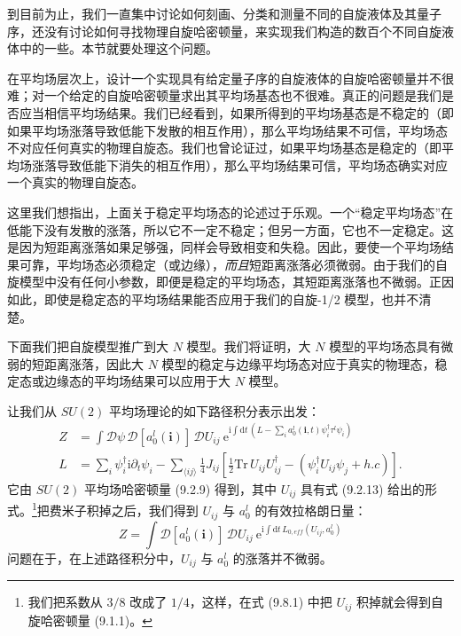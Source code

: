 到目前为止，我们一直集中讨论如何刻画、分类和测量不同的自旋液体及其量子序，还没有讨论如何寻找物理自旋哈密顿量，来实现我们构造的数百个不同自旋液体中的一些。本节就要处理这个问题。

在平均场层次上，设计一个实现具有给定量子序的自旋液体的自旋哈密顿量并不很难；对一个给定的自旋哈密顿量求出其平均场基态也不很难。真正的问题是我们是否应当相信平均场结果。我们已经看到，如果所得到的平均场基态是不稳定的（即如果平均场涨落导致低能下发散的相互作用），那么平均场结果不可信，平均场态不对应任何真实的物理自旋态。我们也曾论证过，如果平均场基态是稳定的（即平均场涨落导致低能下消失的相互作用），那么平均场结果可信，平均场态确实对应一个真实的物理自旋态。

这里我们想指出，上面关于稳定平均场态的论述过于乐观。一个“稳定平均场态”在低能下没有发散的涨落，所以它不一定不稳定；但另一方面，它也不一定稳定。这是因为短距离涨落如果足够强，同样会导致相变和失稳。因此，要使一个平均场结果可靠，平均场态必须稳定（或边缘），\emph{而且}短距离涨落必须微弱。由于我们的自旋模型中没有任何小参数，即便是稳定的平均场态，其短距离涨落也不微弱。正因如此，即使是稳定态的平均场结果能否应用于我们的自旋-1/2 模型，也并不清楚。

下面我们把自旋模型推广到大 $N$ 模型。我们将证明，大 $N$ 模型的平均场态具有微弱的短距离涨落，因此大 $N$ 模型的稳定与边缘平均场态对应于真实的物理态，稳定态或边缘态的平均场结果可以应用于大 $N$ 模型。

让我们从 $SU(2)$ 平均场理论的如下路径积分表示出发：
\begin{equation*}
\begin{aligned}
Z &= \int \mathcal{D}\psi\,\mathcal{D}[a_0^l(\pmb{i})]\,\mathcal{D}U_{ij}\ \mathrm{e}^{\mathrm{i}\int\mathrm{d}t\,(L-\sum_i a_0^l(\pmb{i},t)\psi_i^{\dagger}\tau^{l}\psi_i)} \\
L &= \sum_i \psi_i^{\dagger}\mathrm{i}\partial_t\psi_i-\sum_{\langle ij\rangle}\frac{1}{4}J_{ij}\left[\frac{1}{2}\mathrm{Tr}\,U_{ij}U_{ij}^{\dagger}-(\psi_i^{\dagger}U_{ij}\psi_j+h.c)\right].
\end{aligned}
\tag{9.8.1}
\end{equation*}
它由 $SU(2)$ 平均场哈密顿量 (9.2.9) 得到，其中 $U_{ij}$ 具有式 (9.2.13) 给出的形式。\footnote{我们把系数从 $3/8$ 改成了 $1/4$，这样，在式 (9.8.1) 中把 $U_{ij}$ 积掉就会得到自旋哈密顿量 (9.1.1)。}把费米子积掉之后，我们得到 $U_{ij}$ 与 $a_0^l$ 的有效拉格朗日量：
\begin{equation*}
Z=\int \mathcal{D}[a_0^l(\pmb{i})]\,\mathcal{D}U_{ij}\ \mathrm{e}^{\mathrm{i}\int\mathrm{d}t\,L_{0,eff}(U_{ij},a_0^l)}
\end{equation*}
问题在于，在上述路径积分中，$U_{ij}$ 与 $a_0^l$ 的涨落并不微弱。

